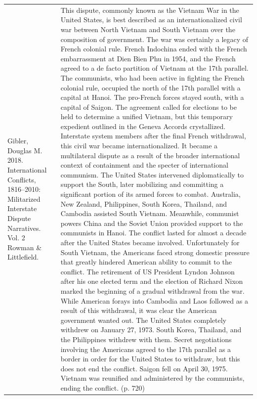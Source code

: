 {\begin{longtable}{p{}p{}}
Gibler, Douglas M. 2018. International Conflicts, 1816–2010: Militarized Interstate Dispute Narratives. Vol. 2 Rowman \& Littlefield. & This dispute, commonly known as the Vietnam War in the United States, is best described as an internationalized civil war between North Vietnam and South Vietnam over the composition of government. The war was certainly a legacy of French colonial rule. French Indochina ended with the French embarrassment at Dien Bien Phu in 1954, and the French agreed to a de facto partition of Vietnam at the 17th parallel. The communists, who had been active in fighting the French colonial rule, occupied the north of the 17th parallel with a capital at Hanoi. The pro-French forces stayed south, with a capital of Saigon. The agreement called for elections to be held to determine a unified Vietnam, but this temporary expedient outlined in the Geneva Accords crystallized. Interstate system members after the final French withdrawal, this civil war became internationalized. It became a multilateral dispute as a result of the broader international context of containment and the specter of international communism. The United States intervened diplomatically to support the South, later mobilizing and committing a significant portion of its armed forces to combat. Australia, New Zealand, Philippines, South Korea, Thailand, and Cambodia assisted South Vietnam. Meanwhile, communist powers China and the Soviet Union provided support to the communists in Hanoi. The conflict lasted for almost a decade after the United States became involved. Unfortunately for South Vietnam, the Americans faced strong domestic pressure that greatly hindered American ability to commit to the conflict. The retirement of US President Lyndon Johnson after his one elected term and the election of Richard Nixon marked the beginning of a gradual withdrawal from the war. While American forays into Cambodia and Laos followed as a result of this withdrawal, it was clear the American government wanted out. The United States completely withdrew on January 27, 1973. South Korea, Thailand, and the Philippines withdrew with them. Secret negotiations involving the Americans agreed to the 17th parallel as a border in order for the United States to withdraw, but this does not end the conflict. Saigon fell on April 30, 1975. Vietnam was reunified and administered by the communists, ending the conflict. (p. 720)
\\

\end{longtable}}
